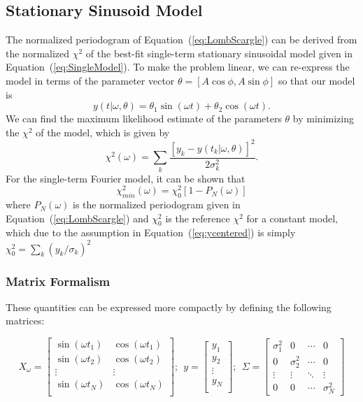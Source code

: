 \documentclass[12pt,preprint]{aastex}
\newcommand{\Eq}[1]{Equation~(\ref{eq:#1})}
\newcommand{\eq}[1]{\Eq{#1}}
\newcommand{\eqlabel}[1]{\label{eq:#1}}
\begin{document}
\subsection{Stationary Sinusoid Model}

The normalized periodogram of \eq{LombScargle} can be derived from the normalized $\chi^2$ of the best-fit single-term stationary sinusoidal model given in \eq{SingleModel}. To make the problem linear, we can re-express the model in terms of the parameter vector $\theta = [A\cos\phi, A\sin\phi]$ so that our model is
\begin{equation}
  \eqlabel{simplemodel}
  y(t|\omega,\theta) = \theta_1\sin(\omega t) + \theta_2\cos(\omega t).
\end{equation}
We can find the maximum likelihood estimate of the parameters $\theta$ by minimizing the $\chi^2$ of the model, which is given by
\begin{equation}
  \chi^2(\omega) = \sum_k \frac{[y_k - y(t_k|\omega,\theta)]^2}{2\sigma_k^2}.
\end{equation}
For the single-term Fourier model, it can be shown \citep[See, e.g.][]{ICVG2014} that
\begin{equation}
  \eqlabel{chi2PN}
  \chi_{min}^2(\omega) = \chi^2_0[1 - P_N(\omega)]
\end{equation}
where $P_N(\omega)$ is the normalized periodogram given in \eq{LombScargle} and $\chi^2_0$ is the reference $\chi^2$ for a constant model, which due to the assumption in \eq{ycentered} is simply $\chi^2_0 = \sum_k (y_k/\sigma_k)^2$


\subsubsection{Matrix Formalism}

These quantities can be expressed more compactly by defining the following matrices:

\begin{equation}
X_\omega = \left[
\begin{array}{cc}
\sin(\omega t_1) & \cos(\omega t_1)\\
\sin(\omega t_2) & \cos(\omega t_2)\\
\vdots & \vdots \\
\sin(\omega t_N) & \cos(\omega t_N)\\
\end{array}
\right];~~
y = \left[
\begin{array}{c}
y_1 \\
y_2\\
\vdots \\
y_N\\
\end{array}
\right];~~
\Sigma = \left[
\begin{array}{cccc}
\sigma_1^2 & 0 &  \cdots & 0\\
0 & \sigma_2^2 &  \cdots & 0\\
\vdots & \vdots &  \ddots & \vdots\\
0 & 0 &  \cdots & \sigma_N^2
\end{array}
\right]
\end{equation}
\end{document}
